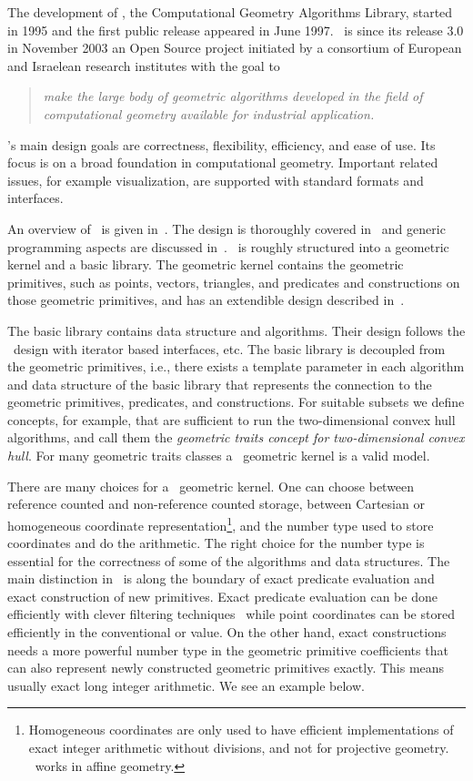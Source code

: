 The development of \cgal, the Computational Geometry Algorithms
Library, started in 1995 and the first public release appeared in June
1997. \cgal\ is since its release 3.0 in November 2003 an Open Source
project initiated by a consortium of European and Israelean research
institutes with the goal to

\begin{quote}
    {\em make the large body of geometric algorithms developed in the field
    of computational geometry available for industrial application.}
\end{quote}
\cgal's main design goals are correctness, flexibility, efficiency,
and ease of use. Its focus is on a broad foundation in computational
geometry. Important related issues, for example visualization, are
supported with standard formats and interfaces.

An overview of \cgal\ is given in~\cite{Kettner04Handbook}. The design
is thoroughly covered in~\cite{fgkss-dccga-00} and generic programming
aspects are discussed in~\cite{bksv-agppd-00}. \cgal\ is roughly
structured into a geometric kernel and a basic library. The geometric
kernel contains the geometric primitives, such as points, vectors,
triangles, and predicates and constructions on those geometric
primitives, and has an extendible design described
in~\cite{hhkps-aegk-01}. 

The basic library contains data structure and
algorithms.  Their design follows the \stl\ design with iterator based
interfaces, etc. The basic library is decoupled from the geometric
primitives, i.e., there exists a template parameter in each
algorithm and data structure of the basic library that represents the
connection to the geometric primitives, predicates, and constructions.
For suitable subsets we define concepts, for example,
that are sufficient to run the two-dimensional convex hull algorithms,
and call them the \emph{geometric traits concept for two-dimensional
  convex hull}. For many geometric traits classes a \cgal\ geometric
kernel is a valid model.

There are many choices for a \cgal\ geometric kernel. One can choose
between reference counted and non-reference counted storage, between
Cartesian or homogeneous coordinate
representation\footnote{Homogeneous coordinates are only used to have
  efficient implementations of exact integer arithmetic without
  divisions, and not for projective geometry. \cgal\ works in affine
  geometry.}, and the number type used to store coordinates and do the
arithmetic. The right choice for the number type is essential for the
correctness of some of the algorithms and data structures. The main
distinction in \cgal\ is along the boundary of exact predicate
evaluation and exact construction of new primitives. Exact predicate
evaluation can be done efficiently with clever filtering
techniques~\cite{bbp-iayed-01} while point coordinates can be stored
efficiently in the conventional  or 
value. On the other hand, exact constructions needs a more powerful
number type in the geometric primitive coefficients that can also
represent newly constructed geometric primitives exactly. This means
usually exact long integer arithmetic. We see an example below.

